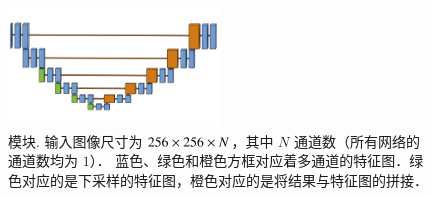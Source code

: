 \renewcommand{\captiontitle}{\UNet{} 模块}
\begin{figure}
\centering
\includegraphics[clip, trim=0 0 0 0,width=0.5\textwidth]{./data/unet-module.png}
\caption[\captiontitle]{\captiontitle{}.  输入图像尺寸为 $256 \times 256 \times N$，其中 $N$ 通道数（所有网络的通道数均为 $1$）．
蓝色、绿色和橙色方框对应着多通道的特征图．绿色对应的是下采样的特征图，橙色对应的是将结果与特征图的拼接．}
\label{fig:unet-module}
\end{figure}

